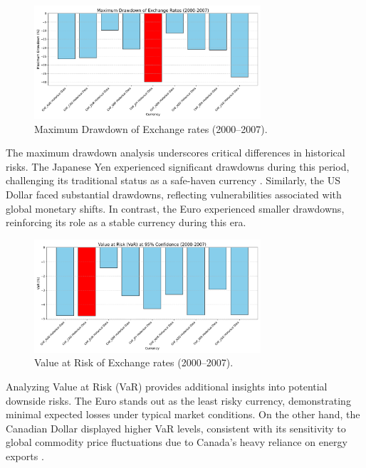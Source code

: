 \documentclass[11pt,a4paper,english,oneside]{book}
\begin{document}
\begin{figure}[h!]
    \centering
    \includegraphics[width=0.75\textwidth]{images/maximum_drawdown_2000_2007.pdf}
    \caption{Maximum Drawdown of Exchange rates (2000--2007).}
    \label{fig:maximum_drawdown_2000_2007}
\end{figure}

The maximum drawdown analysis underscores critical differences in historical risks. The Japanese Yen experienced significant drawdowns during this period, challenging its traditional status as a safe-haven currency \parencite{kopyl2016safe}. Similarly, the US Dollar faced substantial drawdowns, reflecting vulnerabilities associated with global monetary shifts. In contrast, the Euro experienced smaller drawdowns, reinforcing its role as a stable currency during this era.

\begin{figure}[h!]
    \centering
    \includegraphics[width=0.75\textwidth]{images/var_2000_2007.pdf}
    \caption{Value at Risk of Exchange rates (2000--2007).}
    \label{fig:var_2000_2007}
\end{figure}

Analyzing Value at Risk (VaR) provides additional insights into potential downside risks. The Euro stands out as the least risky currency, demonstrating minimal expected losses under typical market conditions. On the other hand, the Canadian Dollar displayed higher VaR levels, consistent with its sensitivity to global commodity price fluctuations due to Canada's heavy reliance on energy exports \parencite{chen2003commodity}.
\end{document}
